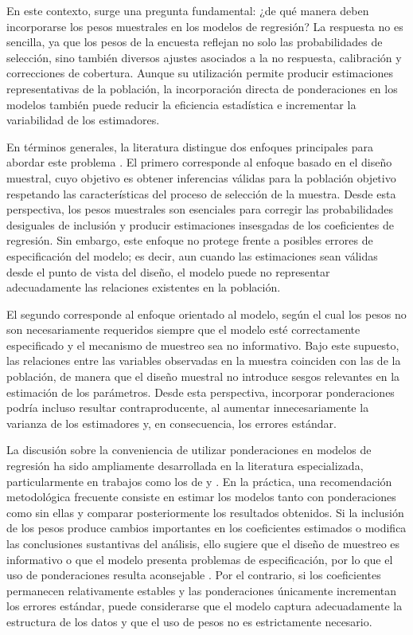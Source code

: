 \documentclass[
  spanish,
  12pt,
]{book}
\begin{document}
En este contexto, surge una pregunta fundamental: ¿de qué manera deben incorporarse los pesos muestrales en los modelos de regresión? La respuesta no es sencilla, ya que los pesos de la encuesta reflejan no solo las probabilidades de selección, sino también diversos ajustes asociados a la no respuesta, calibración y correcciones de cobertura. Aunque su utilización permite producir estimaciones representativas de la población, la incorporación directa de ponderaciones en los modelos también puede reducir la eficiencia estadística e incrementar la variabilidad de los estimadores.

En términos generales, la literatura distingue dos enfoques principales para abordar este problema \citep{heeringa2017applied}. El primero corresponde al enfoque basado en el diseño muestral, cuyo objetivo es obtener inferencias válidas para la población objetivo respetando las características del proceso de selección de la muestra. Desde esta perspectiva, los pesos muestrales son esenciales para corregir las probabilidades desiguales de inclusión y producir estimaciones insesgadas de los coeficientes de regresión. Sin embargo, este enfoque no protege frente a posibles errores de especificación del modelo; es decir, aun cuando las estimaciones sean válidas desde el punto de vista del diseño, el modelo puede no representar adecuadamente las relaciones existentes en la población.

El segundo corresponde al enfoque orientado al modelo, según el cual los pesos no son necesariamente requeridos siempre que el modelo esté correctamente especificado y el mecanismo de muestreo sea no informativo. Bajo este supuesto, las relaciones entre las variables observadas en la muestra coinciden con las de la población, de manera que el diseño muestral no introduce sesgos relevantes en la estimación de los parámetros. Desde esta perspectiva, incorporar ponderaciones podría incluso resultar contraproducente, al aumentar innecesariamente la varianza de los estimadores y, en consecuencia, los errores estándar.

La discusión sobre la conveniencia de utilizar ponderaciones en modelos de regresión ha sido ampliamente desarrollada en la literatura especializada, particularmente en trabajos como los de \citet{skinner1989analysis} y \citet{pfeffermann2011modelling}. En la práctica, una recomendación metodológica frecuente consiste en estimar los modelos tanto con ponderaciones como sin ellas y comparar posteriormente los resultados obtenidos. Si la inclusión de los pesos produce cambios importantes en los coeficientes estimados o modifica las conclusiones sustantivas del análisis, ello sugiere que el diseño de muestreo es informativo o que el modelo presenta problemas de especificación, por lo que el uso de ponderaciones resulta aconsejable \citep{UNhandbook}. Por el contrario, si los coeficientes permanecen relativamente estables y las ponderaciones únicamente incrementan los errores estándar, puede considerarse que el modelo captura adecuadamente la estructura de los datos y que el uso de pesos no es estrictamente necesario.
\end{document}
